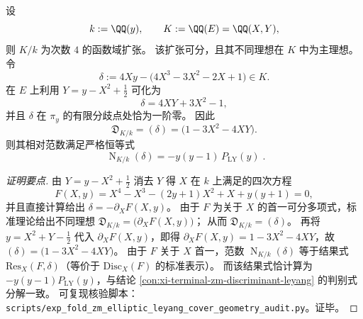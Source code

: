 \begin{conclusion}\label{con:xi-terminal-zm-leyang-discriminant-norm-identity}
设
\[
k:=\QQ(y),\qquad K:=\QQ(E)=\QQ(X,Y),
\]
则 \(K/k\) 为次数 \(4\) 的函数域扩张。
该扩张可分，且其不同理想在 \(K\) 中为主理想。
令
\[
\delta:=4Xy-\bigl(4X^3-3X^2-2X+1\bigr)\in K.
\]
在 \(E\) 上利用 \(Y=y-X^2+\tfrac12\) 可化为
\[
\delta=4XY+3X^2-1,
\]
并且 \(\delta\) 在 \(\pi_y\) 的有限分歧点处恰为一阶零。
因此
\[
\mathfrak D_{K/k}=(\delta)=\bigl(1-3X^2-4XY\bigr).
\]
则其相对范数满足严格恒等式
\[
\boxed{\;
\operatorname{N}_{K/k}(\delta)=-y(y-1)\,P_{\mathrm{LY}}(y)\; }.
\]
\end{conclusion}
\begin{proof}[证明要点]
由 \(Y=y-X^2+\tfrac12\) 消去 \(Y\) 得 \(X\) 在 \(k\) 上满足的四次方程
\[
F(X,y)=X^4-X^3-(2y+1)X^2+X+y(y+1)=0,
\]
并且直接计算给出 \(\delta=-\partial_XF(X,y)\)。
由于 \(F\) 为关于 \(X\) 的首一可分多项式，标准理论给出不同理想
\(
\mathfrak D_{K/k}=\bigl(\partial_XF(X,y)\bigr)
\)；
从而 \(\mathfrak D_{K/k}=(\delta)\)。
再将 \(y=X^2+Y-\tfrac12\) 代入 \(\partial_XF(X,y)\)，即得
\(
\partial_XF(X,y)=1-3X^2-4XY
\)，故 \((\delta)=\bigl(1-3X^2-4XY\bigr)\)。
由于 \(F\) 关于 \(X\) 首一，范数 \(\operatorname{N}_{K/k}(\delta)\) 等于结果式 \(\mathrm{Res}_X(F,\delta)\)（等价于 \(\mathrm{Disc}_X(F)\) 的标准表示）。
而该结果式恰计算为 \(-y(y-1)P_{\mathrm{LY}}(y)\)，与结论 \ref{con:xi-terminal-zm-discriminant-leyang} 的判别式分解一致。
可复现核验脚本：\texttt{scripts/exp\_fold\_zm\_elliptic\_leyang\_cover\_geometry\_audit.py}。证毕。
\end{proof}

